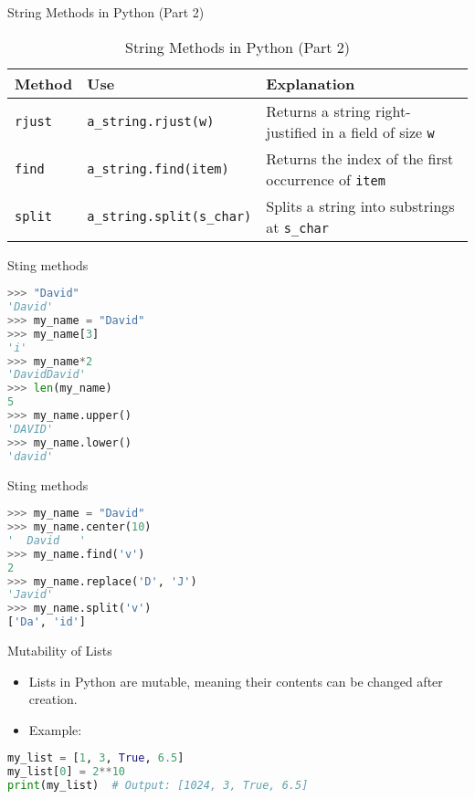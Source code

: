 \begin{frame}{String Methods in Python (Part 2)}
    \begin{table}[]
        \centering
        \begin{tabular}{|l|l|p{5cm}|}
            \hline
            \textbf{Method} & \textbf{Use} & \textbf{Explanation} \\ \hline
            \texttt{rjust} & \texttt{a\_string.rjust(w)} & Returns a string right-justified in a field of size \texttt{w} \\ \hline
            \texttt{find} & \texttt{a\_string.find(item)} & Returns the index of the first occurrence of \texttt{item} \\ \hline
            \texttt{split} & \texttt{a\_string.split(s\_char)} & Splits a string into substrings at \texttt{s\_char} \\ \hline
        \end{tabular}
        \caption{String Methods in Python (Part 2)}
    \end{table}
\end{frame}

\begin{frame}[fragile]{Sting methods}
    \begin{lstlisting}[style=colorful, language=Python]
 >>> "David"
'David'
>>> my_name = "David"
>>> my_name[3]
'i'
>>> my_name*2
'DavidDavid'
>>> len(my_name)
5
>>> my_name.upper()
'DAVID'
>>> my_name.lower()
'david'
\end{lstlisting}
\end{frame}

\begin{frame}[fragile]{Sting methods}
    \begin{lstlisting}[style=colorful, language=Python]
>>> my_name = "David"
>>> my_name.center(10)
'  David   '
>>> my_name.find('v')
2
>>> my_name.replace('D', 'J')
'Javid'
>>> my_name.split('v')
['Da', 'id']    
\end{lstlisting}
\end{frame}


\begin{frame}[fragile]{Mutability of Lists}
    \begin{itemize}
        \item Lists in Python are mutable, meaning their contents can be changed after creation.
        \item Example:
    \end{itemize}
    \begin{lstlisting}[style=colorful, language=Python]
my_list = [1, 3, True, 6.5]
my_list[0] = 2**10
print(my_list)  # Output: [1024, 3, True, 6.5]
    \end{lstlisting}
\end{frame}

